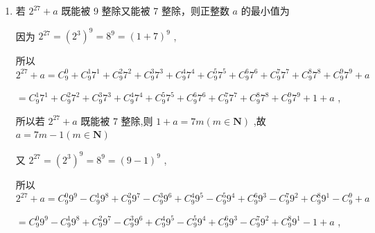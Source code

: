 \begin{enumerate}
\begin{enumerate}
\begin{jieda}
            由 ${2}^{2023} = {\left( 3 - 1\right) }^{2023} = {{C}}_{2023}^{0} \times  {3}^{2023} \cdot  {\left( -1\right) }^{0} + {{C}}_{2023}^{1} \times  {3}^{2022} \cdot  {\left( -1\right) }^{1} + {{C}}_{2023}^{2} \times  {3}^{2021} \cdot  {\left( -1\right) }^{2} + \cdots + {{C}}_{2023}^{2022} \times  3 \cdot  {\left( -1\right) }^{2022} + {{C}}_{2023}^{2023}{\left( -1\right) }^{2023} = 3\left\lbrack  {{{C}}_{2023}^{0} \times  {3}^{2022} \cdot  {\left( -1\right) }^{0} + {{C}}_{2023}^{1} \times  {3}^{2021} \cdot  {\left( -1\right) }^{1} + {{C}}_{2023}^{2} \times  {3}^{2020} \cdot  {\left( -1\right) }^{2} + \cdots  + {{C}}_{2023}^{2022} \cdot  {\left( -1\right) }^{2022}}\right\rbrack   - 1$
            
            故 ${{C}}_{2024}^{1} + {{C}}_{2024}^{3} + {{C}}_{2024}^{5} + \cdots  + {{C}}_{2024}^{2023}$ 被 3 除的余数为 2 .
        \end{jieda}
        \item 若 ${2}^{27} + a$ 既能被 9 整除又能被 7 整除，则正整数 $a$ 的最小值为
        \begin{jieda}
            因为 ${2}^{27} = {\left( {2}^{3}\right) }^{9} = {8}^{9} = {\left( 1 + 7\right) }^{9}$ ,
            
            所以 ${2}^{27} + a = {{C}}_{9}^{0} + {{C}}_{9}^{1}{7}^{1} + {{C}}_{9}^{2}{7}^{2} + {{C}}_{9}^{3}{7}^{3} + {{C}}_{9}^{4}{7}^{4} + {{C}}_{9}^{5}{7}^{5} + {{C}}_{9}^{6}{7}^{6} + {{C}}_{9}^{7}{7}^{7} + {{C}}_{9}^{8}{7}^{8} + {{C}}_{9}^{9}{7}^{9} + a$
            
            $= {{C}}_{9}^{1}{7}^{1} + {{C}}_{9}^{2}{7}^{2} + {{C}}_{9}^{3}{7}^{3} + {{C}}_{9}^{4}{7}^{4} + {{C}}_{9}^{5}{7}^{5} + {{C}}_{9}^{6}{7}^{6} + {{C}}_{9}^{7}{7}^{7} + {{C}}_{9}^{8}{7}^{8} + {{C}}_{9}^{9}{7}^{9} + 1 + a$ ,
            
            所以若 ${2}^{27} + a$ 既能被 7 整除,则 $1 + a = {7m}\left( {m \in  \mathbf{N}}\right)$ ,故 $a = {7m} - 1\left( {m \in  \mathbf{N}}\right)$
            
            又 ${2}^{27} = {\left( {2}^{3}\right) }^{9} = {8}^{9} = {\left( 9 - 1\right) }^{9}$ ,
            
            所以 ${2}^{27} + a = {{C}}_{9}^{0}{9}^{9} - {{C}}_{9}^{1}{9}^{8} + {{C}}_{9}^{2}{9}^{7} - {{C}}_{9}^{3}{9}^{6} + {{C}}_{9}^{4}{9}^{5} - {{C}}_{9}^{5}{9}^{4} + {{C}}_{9}^{6}{9}^{3} - {{C}}_{9}^{7}{9}^{2} + {{C}}_{9}^{8}{9}^{1} - {{C}}_{9}^{9} + a$
            
            $= {{C}}_{9}^{0}{9}^{9} - {{C}}_{9}^{1}{9}^{8} + {{C}}_{9}^{2}{9}^{7} - {{C}}_{9}^{3}{9}^{6} + {{C}}_{9}^{4}{9}^{5} - {{C}}_{9}^{5}{9}^{4} + {{C}}_{9}^{6}{9}^{3} - {{C}}_{9}^{7}{9}^{2} + {{C}}_{9}^{8}{9}^{1} - 1 + a$ ,
            

\end{jieda}
\end{enumerate}
\end{enumerate}
